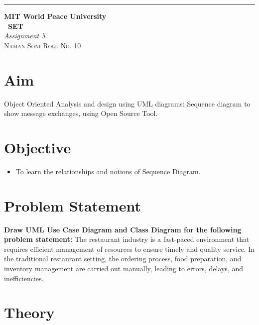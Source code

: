 \documentclass{article}
\begin{document}
\begin{titlepage} %

\raggedleft\rule{1pt}{\textheight} %
\hspace{0.05\textwidth} %
\parbox[b]{0.75\textwidth}
	{%

            {\Huge\bfseries MIT World Peace University \\[0.5\baselineskip] \ SET}\\[2\baselineskip] %
            {\large\textit{Assignment 5}}\\[4\baselineskip] %
            {\Large\textsc{Naman Soni Roll No. 10}} %

   \vspace{0.5\textheight} %
   }

\end{titlepage}
\tableofcontents
\pagebreak
\section{\textbf{Aim}}
Object Oriented Analysis and design using UML diagrams: Sequence diagram to show message exchanges, using Open Source Tool.
\section{\textbf{Objective}}
\begin{itemize}
	\item To learn the relationships and notions of Sequence Diagram.
\end{itemize}
\section{\textbf{Problem Statement}}
\textbf{Draw UML Use Case Diagram and Class Diagram for the following problem statement:} The restaurant industry is a fast-paced environment that requires efficient management of resources to ensure timely and quality service. In the traditional restaurant setting, the ordering process, food preparation, and inventory management are carried out manually, leading to errors, delays, and inefficiencies.
\section{\textbf{Theory}}
\end{document}
